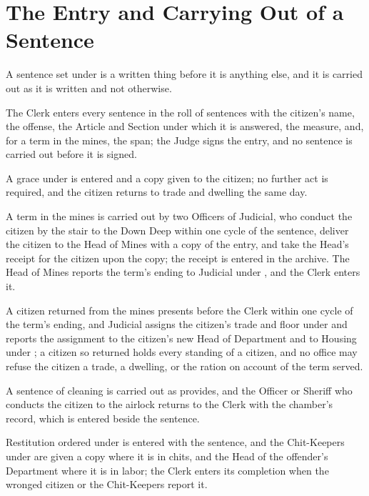 \section{The Entry and Carrying Out of a Sentence}
\label{sec:judicial:entry-and-carrying-out-of-a-sentence}

A sentence set under  is a written thing before it is anything else, and it is carried out as it is written and not otherwise.

\begin{clauses}
\item The Clerk enters every sentence in the roll of sentences with the citizen's name, the offense, the Article and Section under which it is answered, the measure, and, for a term in the mines, the span; the Judge signs the entry, and no sentence is carried out before it is signed.
\item A grace under  is entered and a copy given to the citizen; no further act is required, and the citizen returns to trade and dwelling the same day.
\item A term in the mines is carried out by two Officers of Judicial, who conduct the citizen by the stair to the Down Deep within one cycle of the sentence, deliver the citizen to the Head of Mines with a copy of the entry, and take the Head's receipt for the citizen upon the copy; the receipt is entered in the archive. The Head of Mines reports the term's ending to Judicial under , and the Clerk enters it.
\item A citizen returned from the mines presents before the Clerk within one cycle of the term's ending, and Judicial assigns the citizen's trade and floor under  and reports the assignment to the citizen's new Head of Department and to Housing under ; a citizen so returned holds every standing of a citizen, and no office may refuse the citizen a trade, a dwelling, or the ration on account of the term served.
\item A sentence of cleaning is carried out as  provides, and the Officer or Sheriff who conducts the citizen to the airlock returns to the Clerk with the chamber's record, which is entered beside the sentence.
\item Restitution ordered under  is entered with the sentence, and the Chit-Keepers under  are given a copy where it is in chits, and the Head of the offender's Department where it is in labor; the Clerk enters its completion when the wronged citizen or the Chit-Keepers report it.
\end{clauses}

